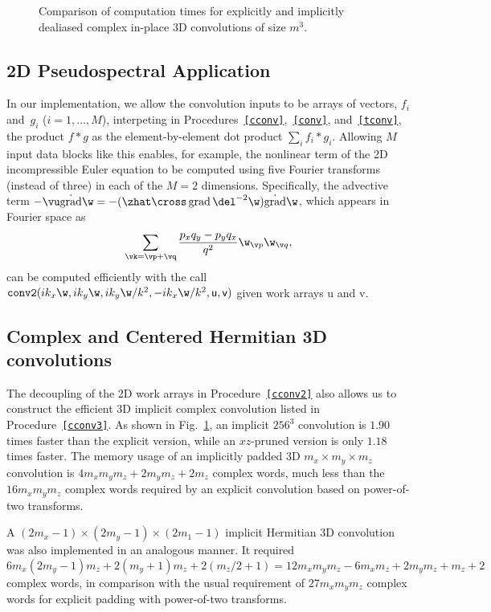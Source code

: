 \documentclass[final]{siamltex}
\begin{document}
\begin{figure}[htbp]
\begin{minipage}{0.49\linewidth}
\begin{center}
\caption{Comparison of computation times for explicitly and implicitly
dealiased complex in-place 3D convolutions of size $m^3$.}
\label{timing3c}
\end{center}
\end{minipage}
%
\end{figure}

\subsection{2D Pseudospectral Application}
In our implementation, we allow the
convolution inputs to be arrays of vectors, $f_i$ and~$g_i$ ($i=1,\ldots,M$),
interpeting in Procedures~{\tt\ref{cconv}},~{\tt\ref{conv}},
and~{\tt\ref{tconv}}, the product $f * g$ as the element-by-element
dot product $\sum_i f_i * g_i$.
Allowing $M$ input data blocks like this enables, for example,
the nonlinear term of the 2D incompressible Euler equation
to be computed using five Fourier transforms (instead of three) in
each of the $M=2$ dimensions. Specifically, the advective term
$-\vu\dot\grad\w=-(\zhat\cross\grad \del^{-2}\w)\dot \grad \w$,
which appears in Fourier space as
$$
\sum_{\vk=\vp+\vq} \frac{p_xq_y - p_y q_x}{q^2}\w_{\v p}\w_{\v q},
$$
can be computed efficiently with the call
${\tt conv2}(i k_x\w,i k_y\w,i k_y \w/k^2,-ik_x\w/k^2,{\sf u},{\sf v})$
given work arrays {\sf u} and {\sf v}.

\subsection{Complex and Centered Hermitian 3D convolutions}

The decoupling of the 2D work arrays in Procedure~{\tt\ref{cconv2}}
also allows us to construct the efficient 3D implicit complex convolution
listed in Procedure~{\tt\ref{cconv3}}. As shown in Fig.~\ref{timing3c}, an implicit
$256^3$ convolution is $1.90$ times faster than the explicit version, while
an $xz$-pruned version is only $1.18$ times faster. The memory usage of an
implicitly padded 3D $m_x\times m_y\times m_z$ convolution is
$4m_xm_ym_z+2m_y m_z+2m_z$ complex words, much less than the
$16m_xm_ym_z$ complex words required by an explicit 
convolution based on power-of-two transforms.

A $(2m_x-1)\times (2m_y-1)\times (2m_1-1)$ implicit Hermitian 3D
convolution was also implemented in an analogous manner. It required
$$
6m_x(2m_y-1)m_z+2(m_y+1)m_z+2(m_z/2+1)=12m_xm_ym_z-6m_xm_z+2m_ym_z+m_z+2
$$
complex words, in comparison with the usual requirement of $27m_xm_ym_z$
complex words for explicit padding with power-of-two transforms.
\end{document}
